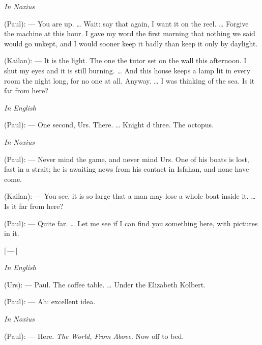\begin{room}

\textit{In Noxius}

(Paul): --- You are up. \ldots{} Wait: say that again, I want it on the reel. \ldots{} Forgive the machine at this hour. I gave my word the first morning that nothing we said would go unkept, and I would sooner keep it badly than keep it only by daylight.

(Kailan): --- It is the light. The one the tutor set on the wall this afternoon. I shut my eyes and it is still burning. \ldots{} And this house keeps a lamp lit in every room the night long, for no one at all. Anyway. \ldots{} I was thinking of the sea. Is it far from here?

\textit{In English}

(Paul): --- One second, Urs. There. \ldots{} Knight d three. The octopus.

\textit{In Noxius}

(Paul): --- Never mind the game, and never mind Urs. One of his boats is lost, fast in a strait; he is awaiting news from his contact in Isfahan, and none have come.

(Kailan): --- You see, it is so large that a man may lose a whole boat inside it. \ldots{} Is it far from here?

(Paul): --- Quite far. \ldots{} Let me see if I can find you something here, with pictures in it.

\centerline{[\,---\,]}

\textit{In English}

(Urs): --- Paul. The coffee table. \ldots{} Under the Elizabeth Kolbert.

(Paul): --- Ah: excellent idea.

\textit{In Noxius}

(Paul): --- Here. \textit{The World, From Above}. Now off to bed.

\end{room}
